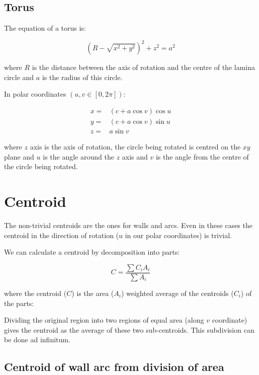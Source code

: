 \documentclass[a4paper,10pt]{article}
\begin{document}
\subsection{Torus}

The equation of a torus is:

\begin{equation}
(R - \surd{x^2 + y^2})^2 + z^2 = a^2 \label{eqb:torus:cart}
\end{equation}

where $R$ is the distance between the axis of rotation and 
the centre of the lamina circle and $a$ is the radius of
this circle.

In polar coordinates $(u,v \in{} [0,2\pi{}])$:

\begin{align}
x =& (c + a\cos{v})\cos{u} \label{eqn:torus:polar} \\
y =& (c + a\cos{v})\sin{u} \nonumber{}\\
z =& a\sin{v} \nonumber
\end{align}

where $z$ axis is the axis of rotation, the circle 
being rotated is centred on the $xy$ plane and $u$ is the 
angle around the $z$ axis and $v$ is the angle from
the centre of the circle being rotated.

\section{Centroid}

The non-trivial centroids are the ones for walls and arcs.
Even in these cases the centroid in the direction of rotation
($u$ in our polar coordinates) is trivial.

We can calculate a centroid by decomposition into parts:

\begin{equation}
C = \frac{\sum{C_i}{A_i}}{\sum{A_i}} \label{eqn:centroid:area}
\end{equation}

where the centroid ($C$) is the area ($A_i$) weighted average
of the centroids ($C_i$) of the parts:

Dividing the original region into two regions of equal area
(along $v$ coordinate) gives the centroid as the average of
these two sub-centroids. This subdivision can be done ad 
infinitum.

\subsection{Centroid of wall arc from division of area}
\end{document}
